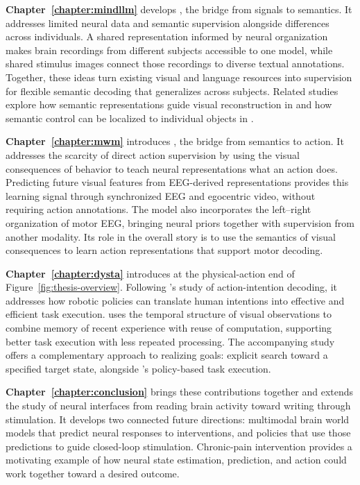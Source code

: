 \textbf{Chapter~\ref{chapter:mindllm}} develops \mindllm{}, the bridge from signals to semantics. It addresses limited neural data and semantic supervision alongside differences across individuals. A shared representation informed by neural organization makes brain recordings from different subjects accessible to one model, while shared stimulus images connect those recordings to diverse textual annotations. Together, these ideas turn existing visual and language resources into supervision for flexible semantic decoding that generalizes across subjects. Related studies explore how semantic representations guide visual reconstruction in \prism{} and how semantic control can be localized to individual objects in \dedit{}.

\textbf{Chapter~\ref{chapter:mwm}} introduces \mwm{}, the bridge from semantics to action. It addresses the scarcity of direct action supervision by using the visual consequences of behavior to teach neural representations what an action does. Predicting future visual features from EEG-derived representations provides this learning signal through synchronized EEG and egocentric video, without requiring action annotations. The model also incorporates the left--right organization of motor EEG, bringing neural priors together with supervision from another modality. Its role in the overall story is to use the semantics of visual consequences to learn action representations that support motor decoding.

\textbf{Chapter~\ref{chapter:dysta}} introduces \dysta{} at the physical-action end of Figure~\ref{fig:thesis-overview}. Following \mwm{}'s study of action-intention decoding, it addresses how robotic policies can translate human intentions into effective and efficient task execution. \dysta{} uses the temporal structure of visual observations to combine memory of recent experience with reuse of computation, supporting better task execution with less repeated processing. The accompanying \phil{} study offers a complementary approach to realizing goals: explicit search toward a specified target state, alongside \dysta{}'s policy-based task execution.

\textbf{Chapter~\ref{chapter:conclusion}} brings these contributions together and extends the study of neural interfaces from reading brain activity toward writing through stimulation. It develops two connected future directions: multimodal brain world models that predict neural responses to interventions, and policies that use those predictions to guide closed-loop stimulation. Chronic-pain intervention provides a motivating example of how neural state estimation, prediction, and action could work together toward a desired outcome.
